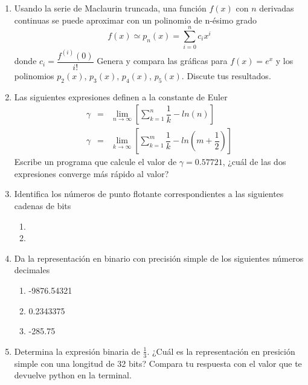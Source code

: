\documentclass[11pt]{article}
\begin{document}
\begin{enumerate}
\item Usando la serie de Maclaurin truncada, una función $f(x)$ con $n$ derivadas continuas se puede aproximar con un polinomio de n-\'{e}simo grado
\[ f(x) \simeq p_{n}(x) = \sum_{i=0}^{n} c_{i} x^{i} \]
donde $c_{i} = \dfrac{f^{(i)}(0)}{i!}$
Genera y compara las gr\'{a}ficas para $f(x)= e^{x}$ y los polinomios $p_{2}(x)$, $p_{3}(x)$, $p_{4}(x)$, $p_{5}(x)$. Discute tus resultados.
\item Las siguientes expresiones definen a la constante de Euler
\begin{eqnarray}
\gamma &=& \lim_{n \rightarrow \infty} \left[ \sum_{k=1}^{n} \dfrac{1}{k} - ln (n) \right] \\
\gamma &=& \lim_{k \rightarrow \infty} \left[ \sum_{k=1}^{m} \dfrac{1}{k} - ln \left( m + \dfrac{1}{2} \right) \right]
\end{eqnarray}
Escribe un programa que calcule el valor de $\gamma = 0.57721$, ¿cu\'{a}l de las dos expresiones converge m\'{a}s r\'{a}pido al valor?
\item Identifica los n\'{u}meros de punto flotante correspondientes a las siguientes cadenas de bits
\begin{enumerate}
\item {}
\item {}
\end{enumerate}
\item Da la representaci\'{o}n en binario con precisi\'{o}n simple de los siguientes n\'{u}meros decimales
\begin{enumerate}
\item -9876.54321
\item 0.2343375
\item -285.75
\end{enumerate}
\item Determina la expresi\'{o}n binaria de $\frac{1}{3}$. ¿Cu\'{a}l es la representaci\'{o}n en presici\'{o}n simple con una longitud de 32 bits? Compara tu respuesta con el valor que te devuelve python en la terminal.
\end{enumerate}
\end{document}

